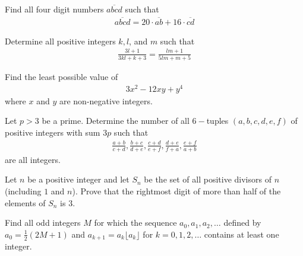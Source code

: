 \documentclass[problems.tex]{subfile}
\begin{document}
	\begin{problem}
		Find all four digit numbers $\overline{abcd}$ such that
		\begin{align*}
			\overline{abcd} = 20 \cdot \overline{ab} + 16 \cdot \overline{cd}
		\end{align*}
	\end{problem}



	\begin{problem}
		Determine all positive integers $k,l$, and $m$ such that
		\begin{align*}
			\frac{3l+1}{3kl+k+3} = \frac{lm + 1}{5lm+m+5}
		\end{align*}
	\end{problem}


	\begin{problem}
		Find the least possible value of
		\begin{align*}
			3x^2 - 12xy + y^4
		\end{align*}
		where $x$ and $y$ are non-negative integers.
	\end{problem}


	\begin{problem}
		Let $p>3$ be a prime. Determine the number of all $6-$tuples $(a,b,c,d,e,f)$ of positive integers with sum $3p$ such that
		\begin{align*}
			\frac{a+b}{c+d}, \frac{b+c}{d+e}, \frac{c+d}{e+f}, \frac{d+e}{f+a}, \frac{e+f}{a+b}
		\end{align*}
		are all integers.
	\end{problem}


	\begin{problem}
		Let $n$ be a positive integer and let $S_n$ be the set of all positive divisors of $n$ (including $1$ and $n$). Prove that the rightmost digit of more than half of the elements of $S_n$ is $3$.
	\end{problem}



	\begin{problem}
		Find all odd integers $M$ for which the sequence $a_0,a_1,a_2,\dots$ defined by $a_0=\frac{1}{2}(2M+1)$ and $a_{k+1} = a_k \lfloor a_k \rfloor$ for $k=0,1,2,\dots$ contains at least one integer.
	\end{problem}
\end{document}
